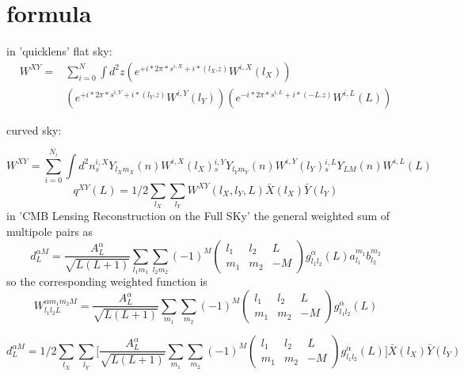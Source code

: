 \documentclass[11pt]{article}
\begin{document}
\section{formula}
\label{sec-3}
in 'quicklens' 
flat sky:
\begin{equation}
\begin{split}
W^{XY} =& \sum_{i=0}^{N} \int{d^2 z}(e^{+i*2\pi*s^{i,X}+i*(l_X.z)} W^{i,X}(l_X))\\&(e^{+i*2\pi*s^{i,Y}+i*(l_Y.z)} W^{i,Y}(l_Y))(e^{-i*2\pi*s^{i,L}+i*( -L.z)} W^{i,L}( L ))
\end{split}
\end{equation}

curved sky:


\begin{equation}
W^{XY} = \sum_{i=0}^{N_i} \int{d^2 n} {}_s^{i,X}Y_{l_X m_X}(n) W^{i,X}(l_X){}_s^{i,Y}Y_{l_Y m_Y}(n) W^{i,Y}(l_Y){}_s^{i,L}Y_{  L M  }(n) W^{i,L}( L )
\end{equation}
\begin{equation}
q^{XY}(L) = 1/2 \sum_{l_X} \sum_{l_Y}W^{XY}(l_X, l_Y, L) \bar{X}(l_X) \bar{Y}(l_Y)
\end{equation}
in  'CMB Lensing Reconstruction on the Full SKy' 
the general weighted sum of multipole pairs as
\begin{equation}
d^{\alpha M}_{L}=\frac{A_{L}^{\alpha}}{\sqrt{L(L+1)}} \sum_{l_{1} m_{1}} \sum_{l_{2} m_{2}}(-1)^{M} \left( \begin{array}{ccc}{l_{1}} & {l_{2}} & {L} \\ {m_{1}} & {m_{2}} & {-M}\end{array}\right) g_{l_{1} l_{2}}^{\alpha}(L) a_{l_{1}}^{m_{1}} b_{l_{2}}^{m_{2}}
\end{equation}
so the corresponding weighted function is 
\begin{equation}
W_{l_{1}l_{2}L}^{\alpha m_{1}m_{2}M}=\frac{A_{L}^{\alpha}}{\sqrt{L(L+1)}} \sum_{m_{1}} \sum_{m_{2}}(-1)^{M} \left( \begin{array}{ccc}{l_{1}} & {l_{2}} & {L} \\ {m_{1}} & {m_{2}} & {-M}\end{array}\right) g_{l_{1} l_{2}}^{\alpha}(L)
\end{equation}

\begin{equation}
d^{\alpha M}_{L}=1/2 \sum_{l_X} \sum_{l_Y}\big[ \frac{A_{L}^{\alpha}}{\sqrt{L(L+1)}} \sum_{m_{1}} \sum_{m_{2}}(-1)^{M} \left( \begin{array}{ccc}{l_{1}} & {l_{2}} & {L} \\ {m_{1}} & {m_{2}} & {-M}\end{array}\right) g_{l_{1} l_{2}}^{\alpha}(L)\big] \bar{X}(l_X) \bar{Y}(l_Y)
  \end{equation}
\end{document}
